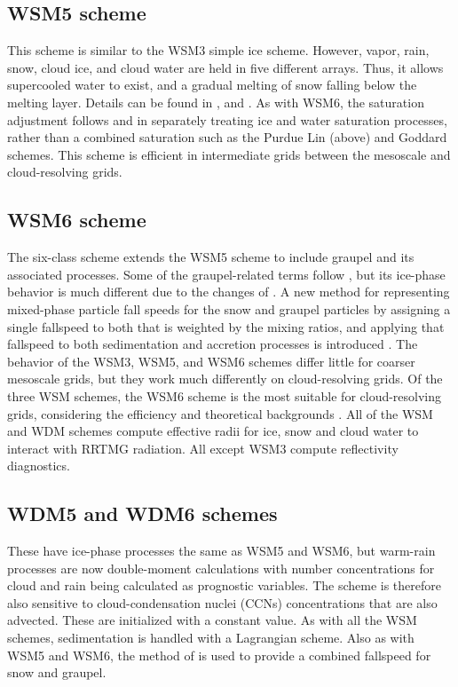\subsection{WSM5 scheme}

This scheme is similar to the WSM3 simple ice scheme. However, vapor, rain, snow, cloud ice,
and cloud water are held in five different arrays. Thus, it allows supercooled water to exist, and
a gradual melting of snow falling below the melting layer. Details can be found in 
\citet{hong04}, and \citet{honglim06}. As with WSM6, the saturation adjustment follows \citet{dudhia89} and \citet{hong98} in separately treating ice and water saturation processes, rather than a combined saturation such as the Purdue Lin (above) and Goddard \citep{tao89} schemes. This scheme is efficient in intermediate grids between the mesoscale and cloud-resolving grids.

\subsection{WSM6 scheme}

The six-class scheme extends the WSM5 scheme to include graupel and its associated processes.
Some of the graupel-related terms follow \citet{lin83}, but its ice-phase behavior is much different due to the changes of \citet{hong04}. A new method for representing mixed-phase particle fall speeds for the snow and graupel particles by assigning a single fallspeed to both that is weighted by the mixing ratios, and applying that fallspeed to both sedimentation and accretion processes is introduced \citep{dudhia08}. The behavior of the WSM3, WSM5, and WSM6 schemes differ little for coarser mesoscale grids, but they work much differently on cloud-resolving grids. Of the three WSM schemes, the WSM6 scheme is the most suitable for cloud-resolving grids, considering the efficiency and theoretical backgrounds \citep{honglim06}. All of the WSM and WDM schemes compute effective radii for ice, snow and cloud water to interact with RRTMG radiation. All except WSM3 compute reflectivity diagnostics.

\subsection{WDM5 and WDM6 schemes}

These have ice-phase processes the same as WSM5 and WSM6, but warm-rain processes are now double-moment calculations \citep{lim10} with number concentrations for cloud and rain being calculated as prognostic variables. The scheme is therefore also sensitive to cloud-condensation nuclei (CCNs) concentrations that are also advected. These are initialized with a constant value. As with all the WSM schemes, sedimentation is handled with a Lagrangian scheme. Also as with WSM5 and WSM6, the method of \citet{dudhia08} is used
to provide a combined fallspeed for snow and graupel.

